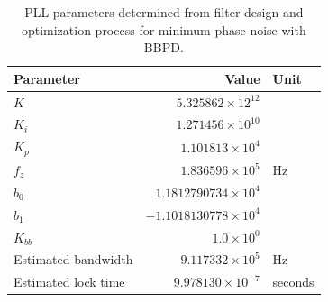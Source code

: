 		\begin{table}[h!]
			\centering
			\def\arraystretch{1.5}		
			\setlength\arrayrulewidth{0.75pt}
			\setlength{\tabcolsep}{1em} %
			\begin{tabular}{|l|r|l|}
				\hline 
				\rule[-1ex]{0pt}{2.5ex} \cellcolor{gray!40}\textbf{Parameter} & \cellcolor{gray!40}\textbf{Value} & \cellcolor{gray!40}\textbf{Unit }\\ 
				\hline 
				\rule[-1ex]{0pt}{2.5ex} \textbf{$K$}  & $5.325862\times12^{12}$ &  \\
				\hline 
				\rule[-1ex]{0pt}{2.5ex} \textbf{$K_i$}  & $1.271456\times10^{10}$ &  \\
				\hline 
				\rule[-1ex]{0pt}{2.5ex} \textbf{$K_p$}  & $1.101813\times10^{4}$ &  \\
				\hline 
				\rule[-1ex]{0pt}{2.5ex} \textbf{$f_z$} & $1.836596\times10^5$ & Hz\\
				\hline 
				\rule[-1ex]{0pt}{2.5ex} \textbf{$b_0$}  & $1.1812790734\times10^4$  &\\
				\hline 
				\rule[-1ex]{0pt}{2.5ex} \textbf{$b_1$}  & $-1.1018130778\times10^4$  & \\
				\hline 
				\rule[-1ex]{0pt}{2.5ex} \textbf{$K_{bb}$}  & $1.0\times10^0$  & \\ 
				\hline 
				\rule[-1ex]{0pt}{2.5ex} Estimated bandwidth & $9.117332\times10^5$ & Hz \\
				\hline 
				\rule[-1ex]{0pt}{2.5ex} Estimated lock time & $9.978130\times10^{-7}$ & seconds \\
				\hline 
			\end{tabular} 
			\caption{PLL parameters determined from filter design and optimization process for minimum phase noise with BBPD.}
			\label{filter_params_bbpd_low_noise}
		\end{table}   

